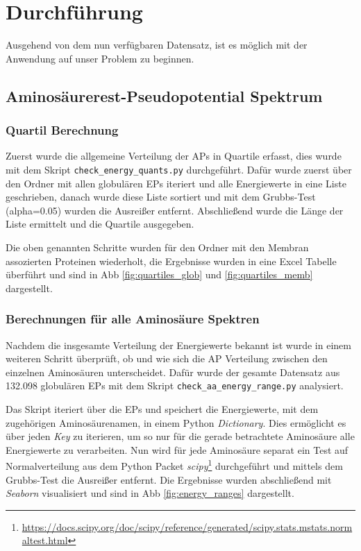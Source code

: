 \chapter{Durchführung}
\label{chap:durchfuerung}

Ausgehend von dem nun verfügbaren Datensatz, ist es möglich mit der Anwendung auf unser Problem zu beginnen.



\section{Aminosäurerest-Pseudopotential Spektrum}


\subsection{Quartil Berechnung}

Zuerst wurde die allgemeine Verteilung der \ac{APs} in Quartile erfasst, dies wurde mit dem Skript \texttt{check\_energy\_quants.py} durchgeführt. Dafür wurde zuerst über den Ordner mit allen globulären \ac{EP}s iteriert und alle Energiewerte in eine Liste geschrieben, danach wurde diese Liste sortiert und mit dem Grubbs-Test\cite{Jain.2010} (alpha=0.05) wurden die Ausreißer entfernt. Abschließend wurde die Länge der Liste ermittelt und die Quartile ausgegeben.

Die oben genannten Schritte wurden für den Ordner mit den Membran assozierten Proteinen wiederholt, die Ergebnisse wurden in eine Excel Tabelle überführt und sind in \ac{Abb} \ref{fig:quartiles_glob} und \ref{fig:quartiles_memb} dargestellt.


\subsection{Berechnungen für alle Aminosäure Spektren}
Nachdem die insgesamte Verteilung der Energiewerte bekannt ist wurde in einem weiteren Schritt überprüft, ob und wie sich die \ac{AP} Verteilung zwischen den einzelnen Aminosäuren unterscheidet. Dafür wurde der gesamte Datensatz aus 132.098 globulären \ac{EP}s mit dem Skript \texttt{check\_aa\_energy\_range.py} analysiert. 

Das Skript iteriert über die \ac{EP}s und speichert die Energiewerte, mit dem zugehörigen Aminosäurenamen, in einem Python \emph{Dictionary}. Dies ermöglicht es über jeden \emph{Key} zu iterieren, um so nur für die gerade betrachtete Aminosäure alle Energiewerte zu verarbeiten. Nun wird für jede Aminosäure separat ein Test auf Normalverteilung aus dem Python Packet \emph{scipy}\footnote{\url{https://docs.scipy.org/doc/scipy/reference/generated/scipy.stats.mstats.normaltest.html}} durchgeführt und mittels dem Grubbs-Test die Ausreißer entfernt. Die Ergebnisse wurden abschließend mit \emph{Seaborn} visualisiert und sind in \ac{Abb} \ref{fig:energy_ranges} dargestellt. 

